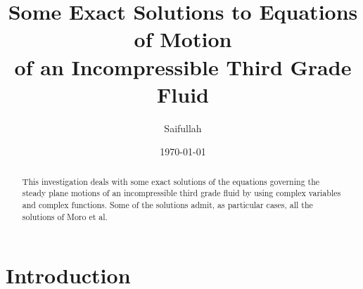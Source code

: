 \documentclass[twocolumn,showpacs,preprintnumbers,amsmath,amssymb]{revtex4}
\begin{document}

\title{Some Exact Solutions to
Equations of Motion\\ of an Incompressible Third Grade Fluid}%

\author{Saifullah}
%


\date{\today}%

\begin{abstract}
This investigation deals with some exact solutions of the equations
governing the steady plane motions of an incompressible third grade
fluid by using complex variables and complex functions. Some of the
solutions admit, as particular cases, all the solutions of Moro et
al.
\end{abstract}

\maketitle

\section{\label{sec:level1}Introduction}
\end{document}
